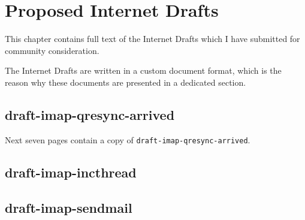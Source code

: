 \documentclass[trojita]{subfiles}
\begin{document}
\chapter{Proposed Internet Drafts}
\label{sec:id-copy}

This chapter contains full text of the Internet Drafts which I have submitted for community consideration.

The Internet Drafts are written in a custom document format, which is the reason why these documents are presented in a
dedicated section.

\section{draft-imap-qresync-arrived}

Next seven pages contain a copy of {\tt draft-imap-qresync-arrived}.



\section{draft-imap-incthread}


\section{draft-imap-sendmail}

\end{document}
